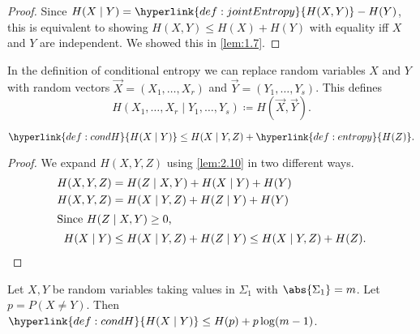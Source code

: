 \documentclass{article}
\newcommand{\1}[1]{\mathbbm{1}_{#1}}
\begin{document}
\begin{proof}
    Since $H(X \mid Y) = \hyperlink{def:jointEntropy}{H(X, Y)} - H(Y)$, this is equivalent to showing $H(X, Y) \leq H(X) + H(Y)$ with equality iff $X$ and $Y$ are independent. We showed this in \cref{lem:1.7}.
\end{proof}

\begin{notation}
    In the definition of conditional entropy we can replace random variables $X$ and $Y$ with random vectors $\vec{X} = (X_1, \dotsc, X_r)$ and $\vec{Y} = (Y_1,  \dotsc, Y_s)$.  This defines
    \begin{equation*}H(X_1, \dotsc, X_r \mid Y_1, \dotsc, Y_s) \coloneqq H(\vec{X}, \vec{Y}).\end{equation*}
\end{notation}

\begin{nlemma}\label{lem:2.11}
    $\hyperlink{def:condH}{H(X \mid Y)} \leq H(X \mid Y , Z) + \hyperlink{def:entropy}{H(Z)}.$
\end{nlemma}

\begin{proof}
    We expand $H(X, Y, Z)$ using \cref{lem:2.10} in two different ways.
    \begin{align*}
        H(X, Y, Z) &= H(Z \mid X, Y) + H(X \mid Y) + H(Y) \\
        H(X, Y, Z) &= H(X \mid Y, Z) + H(Z \mid Y) + H(Y) \\
        \shortintertext{Since $H(Z\mid X,Y) \geq 0$,}
        H(X \mid Y) &\leq H(X \mid Y, Z) + H(Z \mid Y) \leq H(X \mid Y, Z) + H(Z). \qedhere
    \end{align*}
\end{proof}

\begin{nlemma}\label{lem:2.12}
    Let $X,Y$ be random variables taking values in $\Sigma_1$ with $\abs{\Sigma_1} = m$.
    Let $p  = P(X \neq Y)$. Then $\hyperlink{def:condH}{H(X \mid Y)} \leq H(p) + p \log(m-1)$.
\end{nlemma}
\end{document}
